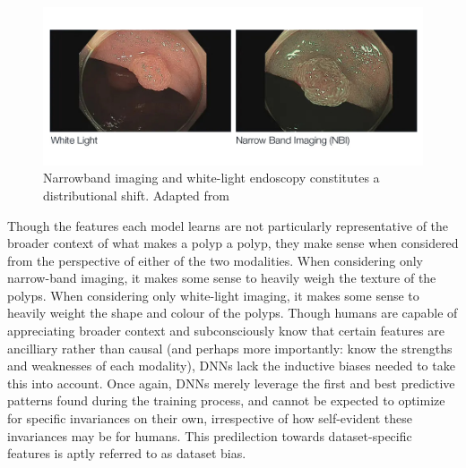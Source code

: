 	\begin{figure}[h]
		\includegraphics[width=\linewidth]{illustrations/narrow_band.jpg}
		\caption{Narrowband imaging and white-light endoscopy constitutes a distributional shift. Adapted from ~\cite{nbi_img}}
		\label{imaging_modalities}
	\end{figure}

	Though the features each model learns are not particularly representative of the broader context of what makes a polyp a polyp, they make sense when considered from the perspective of either of the two modalities. When considering only narrow-band imaging, it makes some sense to heavily weigh the texture of the polyps. When considering only white-light imaging, it makes some sense to heavily weight the shape and colour of the polyps. Though humans are capable of appreciating broader context and subconsciously know that certain features are ancilliary rather than causal (and perhaps more importantly: know the strengths and weaknesses of each modality), DNNs lack the inductive biases needed to take this into account. Once again, DNNs merely leverage the first and best predictive patterns found during the training process, and cannot be expected to optimize for specific invariances on their own, irrespective of how self-evident these invariances may be for humans. This predilection towards dataset-specific features is aptly referred to as dataset bias. 
	
